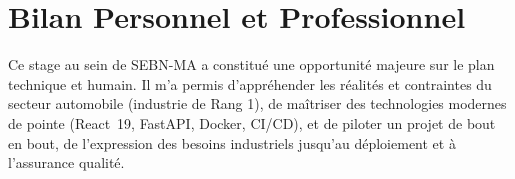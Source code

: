 \section*{Bilan Personnel et Professionnel}
Ce stage au sein de SEBN-MA a constitué une opportunité majeure sur le plan technique et humain. Il m'a permis d'appréhender les réalités et contraintes du secteur automobile (industrie de Rang 1), de maîtriser des technologies modernes de pointe (React~19, FastAPI, Docker, CI/CD), et de piloter un projet de bout en bout, de l'expression des besoins industriels jusqu'au déploiement et à l'assurance qualité.
